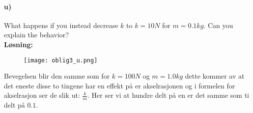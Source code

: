 \documentclass[11pt, A4paper,norsk]{article}
\begin{document}
		\paragraph{u)}
		\begin{flushleft}
What happens if you instead decrease $k$ to $k = 10N$ for $m = 0.1kg$. Can you explain the behavior?\\
\vspace{1mm}
\textbf{Løsning:} \\
\vspace{1mm}

			\begin{figure}[H]
\texttt{[image: oblig3\_u.png]}
			\end{figure}
Bevegelsen blir den samme som for $k = 100N$ og $m = 1.0kg$ dette kommer av at det eneste disse to tingene har en effekt på er akselrasjonen og i formelen for akselrasjon ser de slik ut: $\frac{k}{m}$. Her ser vi at hundre delt på en er det samme som ti delt på $0.1$.
		\end{flushleft}
\end{document}
